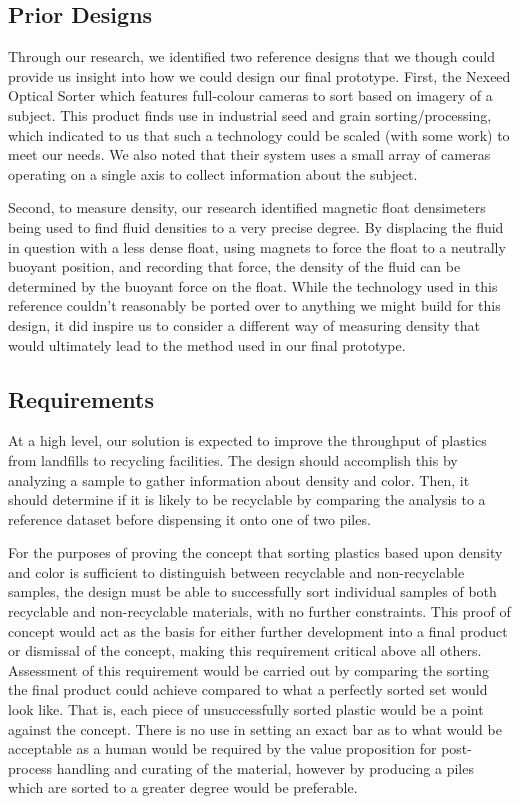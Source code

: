 \documentclass[12pt]{article}
\begin{document}
\begin{multicols*}{2}
        \subsection{Prior Designs}
            Through our research, we identified two reference designs that we though could provide us insight into how we could design our final prototype. First, the Nexeed Optical Sorter which features full-colour cameras to sort based on imagery of a subject. This product finds use in industrial seed and grain sorting/processing, which indicated to us that such a technology could be scaled (with some work) to meet our needs. We also noted that their system uses a small array of cameras operating on a single axis to collect information about the subject.

            Second, to measure density, our research identified magnetic float densimeters being used to find fluid densities to a very precise degree. By displacing the fluid in question with a less dense float, using magnets to force the float to a neutrally buoyant position, and recording that force, the density of the fluid can be determined by the buoyant force on the float. While the technology used in this reference couldn't reasonably be ported over to anything we might build for this design, it did inspire us to consider a different way of measuring density that would ultimately lead to the method used in our final prototype.

        \subsection{Requirements}
            At a high level, our solution is expected to improve the throughput of plastics from landfills to recycling facilities. The design should accomplish this by analyzing a sample to gather information about density and color. Then, it should determine if it is likely to be recyclable by comparing the analysis to a reference dataset before dispensing it onto one of two piles. 

            For the purposes of proving the concept that sorting plastics based upon density and color is sufficient to distinguish between recyclable and non-recyclable samples, the design must be able to successfully sort individual samples of both recyclable and non-recyclable materials, with no further constraints. This proof of concept would act as the basis for either further development into a final product or dismissal of the concept, making this requirement critical above all others. Assessment of this requirement would be carried out by comparing the sorting the final product could achieve compared to what a perfectly sorted set would look like. That is, each piece of unsuccessfully sorted plastic would be a point against the concept. There is no use in setting an exact bar as to what would be acceptable as a human would be required by the value proposition for post-process handling and curating of the material, however by producing a piles which are sorted to a greater degree would be preferable.  


\end{multicols*}
\end{document}
